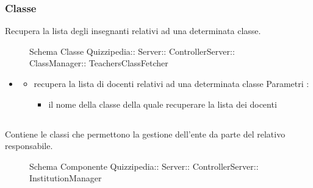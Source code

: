 \subsubsection{Classe }
Recupera la lista degli insegnanti relativi ad una determinata classe.
\begin{figure}[H]
\centering
\noindent{}
\caption[Schema Classe TeachersClassFetcher]{Schema Classe Quizzipedia:: Server:: ControllerServer:: ClassManager:: TeachersClassFetcher}
\end{figure}
\begin{itemize}
\item {}
\begin{itemize}
\item {}
\newline
recupera la lista di docenti relativi ad una determinata classe
\newline
Parametri :
\begin{itemize}
\item {}
\newline
il nome della classe della quale recuperare la lista dei docenti
\end{itemize}
\end{itemize}
\end{itemize}
\subsection{}
Contiene le classi che permettono la gestione dell'ente da parte del relativo responsabile.
\begin{figure}[H]
\centering
\noindent{}
\caption[Schema Componente InstitutionManager]{Schema Componente Quizzipedia:: Server:: ControllerServer:: InstitutionManager}
\end{figure}
